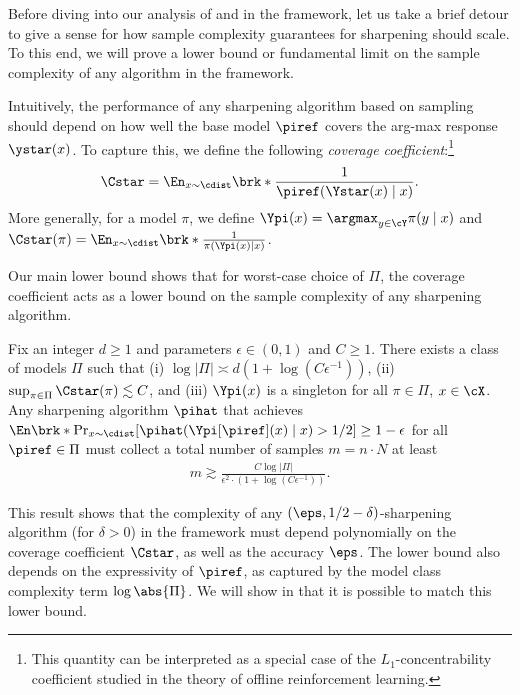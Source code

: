 Before diving into our analysis of \bestofnalg and \rlhfalg in the
\framework framework, let us take a brief detour to give a sense for
how sample complexity guarantees for sharpening should scale. To this end, we will prove a lower bound or fundamental limit on
the sample complexity of any algorithm in the \framework framework.

Intuitively, the performance of any sharpening algorithm based on
sampling should depend on how well the base model $\piref$
covers the arg-max response $\ystar(x)$. To capture this, we define
the following \emph{coverage coefficient}:\footnote{This quantity can
  be interpreted as a special case of the $L_1$-concentrability
  coefficient \citep{farahmand2010error,xie2020q,zanette2021provable,amortila2024scalable}
  studied in the theory of offline reinforcement learning.}\loose
\begin{align}
  \label{eq:cstar}
  \Cstar = \En_{x\sim\cdist}\brk*{\frac{1}{\piref(\Ystar(x)\mid{}x)}}.
\end{align}
More generally, for a model $\pi$, we define
$\Ypi(x)=\argmax_{y\in\cY}\pi(y\mid{}x)$ and 
$  \Cstar(\pi) =
\En_{x\sim\cdist}\brk*{\frac{1}{\pi(\Ypi(x)\mid{}x)}}$. 

Our main lower
bound shows that for worst-case choice of $\Pi$, the coverage coefficient acts as a lower bound on the sample
complexity of any sharpening algorithm.
\begin{theorem}
  \label{thm:lower}
  Fix an integer $d \ge 1$ and parameters $\epsilon \in (0,1)$ and $C
  \ge 1$. There exists a class of models $\Pi$ such that (i) $\log |\Pi|
  \asymp d (1+\log(C \epsilon^{-1}))$, (ii) $\sup_{\pi \in \Pi}
  \Cstar(\pi) \lesssim C$, and (iii) $\Ypi(x)$ is a singleton for all
  $\pi\in\Pi$, $x\in\cX$. Any sharpening algorithm $\pihat$ that
  achieves $\En\brk*{\Pr_{x \sim \cdist}[\pihat(\Ypi[\piref](x)\mid{}x) > 1/2]}  \ge 1
  - \epsilon$ for all $\piref \in \Pi$ must collect a total number of
  samples $m = n\cdot{}N$ at least\loose
  \begin{align}
    m \gtrsim
    \frac{ C\log |\Pi|}{\epsilon^{2}\cdot{}(1+\log(C \epsilon^{-1}))}.
  \end{align}  
\end{theorem}
This result shows that the complexity of any $(\eps,1/2-\delta)$-sharpening algorithm (for $\delta>0$) in the
\framework framework must depend polynomially on the coverage
coefficient $\Cstar$, as well as the accuracy $\eps$. The
lower bound also depends on the expressivity of $\piref$,
as captured by the model class complexity term $\log\abs{\Pi}$. We will show in  that it is possible to match this lower bound. 

